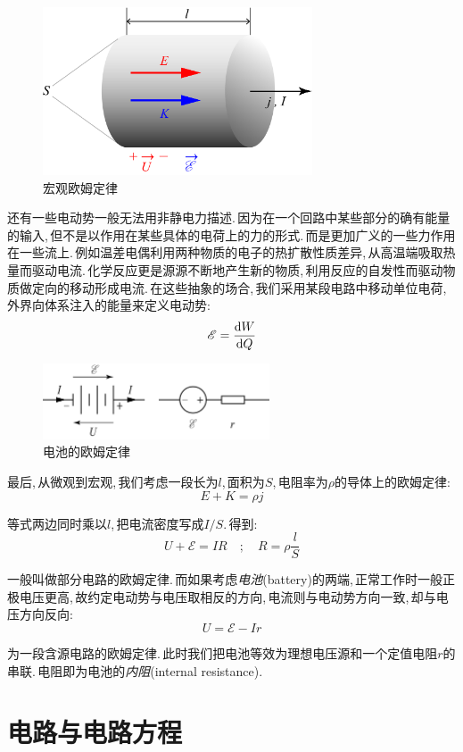 \begin{figure}
\centering
\vspace{-0.5cm}
\includegraphics[width=8cm]{image/7-3-6.png}
\caption{宏观欧姆定律}
\end{figure}
还有一些电动势一般无法用非静电力描述.\,因为在一个回路中某些部分的确有能量的输入,\,但不是以作用在某些具体的电荷上的力的形式.\,而是更加广义的一些力作用在一些流上.\,例如温差电偶利用两种物质的电子的热扩散性质差异,\,从高温端吸取热量而驱动电流.\,化学反应更是源源不断地产生新的物质,\,利用反应的自发性而驱动物质做定向的移动形成电流.\,在这些抽象的场合,\,我们采用某段电路中移动单位电荷,\,外界向体系注入的能量来定义电动势:
\[\mathscr{E}=\frac{\textrm{d} W}{\textrm{d} Q}\]

\begin{figure}[H]
\centering
\includegraphics[width=0.6\textwidth]{image/7-3-7.png}
\caption{电池的欧姆定律}
\end{figure}
最后,\,从微观到宏观,\,我们考虑一段长为$l$,\,面积为$S$,\,电阻率为$\rho$的导体上的欧姆定律:
\[E+K=\rho j\]

等式两边同时乘以$l$,\,把电流密度写成$I/S$.\,得到:
\[U+\mathscr{E}=IR \quad;\quad R=\rho\frac{l}{S}\]

一般叫做部分电路的欧姆定律.\,而如果考虑\emph{电池}(battery)的两端,\,正常工作时一般正极电压更高,\,故约定电动势与电压取相反的方向,\,电流则与电动势方向一致,\,却与电压方向反向:
\[U=\mathscr{E}-Ir\]

为一段含源电路的欧姆定律.\,此时我们把电池等效为理想电压源和一个定值电阻$r$的串联.\,电阻即为电池的\emph{内阻}(internal resistance).






\section{电路与电路方程}

